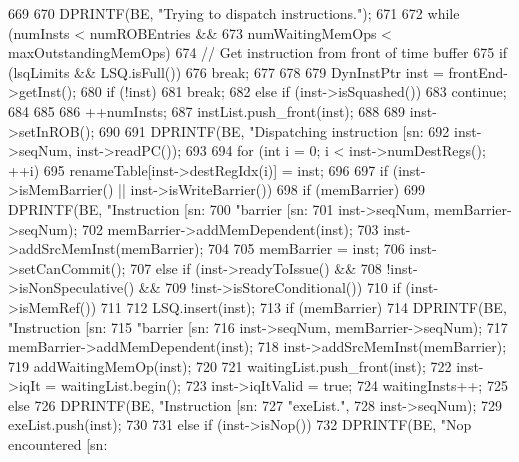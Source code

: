 \begin{DoxyCode}
669 {
670     DPRINTF(BE, "Trying to dispatch instructions.\n");
671 
672     while (numInsts < numROBEntries &&
673            numWaitingMemOps < maxOutstandingMemOps) {
674         // Get instruction from front of time buffer
675         if (lsqLimits && LSQ.isFull()) {
676             break;
677         }
678 
679         DynInstPtr inst = frontEnd->getInst();
680         if (!inst) {
681             break;
682         } else if (inst->isSquashed()) {
683             continue;
684         }
685 
686         ++numInsts;
687         instList.push_front(inst);
688 
689         inst->setInROB();
690 
691         DPRINTF(BE, "Dispatching instruction [sn:%
692                 inst->seqNum, inst->readPC());
693 
694         for (int i = 0; i < inst->numDestRegs(); ++i)
695             renameTable[inst->destRegIdx(i)] = inst;
696 
697         if (inst->isMemBarrier() || inst->isWriteBarrier()) {
698             if (memBarrier) {
699                 DPRINTF(BE, "Instruction [sn:%
700                         "barrier [sn:%
701                         inst->seqNum, memBarrier->seqNum);
702                 memBarrier->addMemDependent(inst);
703                 inst->addSrcMemInst(memBarrier);
704             }
705             memBarrier = inst;
706             inst->setCanCommit();
707         } else if (inst->readyToIssue() &&
708                    !inst->isNonSpeculative() &&
709                    !inst->isStoreConditional()) {
710             if (inst->isMemRef()) {
711 
712                 LSQ.insert(inst);
713                 if (memBarrier) {
714                     DPRINTF(BE, "Instruction [sn:%
715                             "barrier [sn:%
716                             inst->seqNum, memBarrier->seqNum);
717                     memBarrier->addMemDependent(inst);
718                     inst->addSrcMemInst(memBarrier);
719                     addWaitingMemOp(inst);
720 
721                     waitingList.push_front(inst);
722                     inst->iqIt = waitingList.begin();
723                     inst->iqItValid = true;
724                     waitingInsts++;
725                 } else {
726                     DPRINTF(BE, "Instruction [sn:%
727                             "exeList.\n",
728                             inst->seqNum);
729                     exeList.push(inst);
730                 }
731             } else if (inst->isNop()) {
732                 DPRINTF(BE, "Nop encountered [sn:%
}}}}
\end{DoxyCode}

